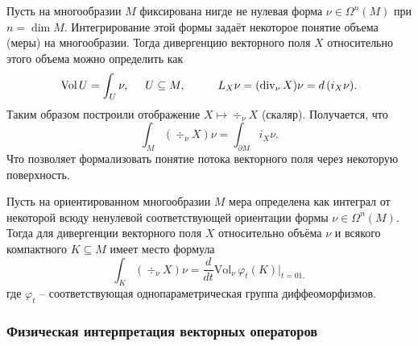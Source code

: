 \begin{to_tas}
     Пусть на многообразии $M$ фиксирована нигде не нулевая форма $\nu \in \Omega^n(M)$ при $n = \dim M$. Интегрирование этой формы задаёт некоторое понятие объема (меры) на многообразии. Тогда дивергенцию векторного поля $X$ относительно этого объема можно определить как
     \begin{equation*}
        \text{Vol}\, U = \int_U \nu, 
        \hspace{0.5cm} 
        U \subseteq M,
        \hspace{1cm}
         L_X \nu = (\div_\nu X) \nu = d\, (i_X \nu).
     \end{equation*}
     Таким образом построили отображение $X \mapsto \div_\nu X$ (скаляр). Получается, что
    \begin{equation*}
        \int_M (\div_\nu X) \nu = \int_{\partial M} i_X \nu.
    \end{equation*}
    Что позволяет формализовать понятие потока векторного поля через некоторую поверхность.
\end{to_tas}

\begin{to_thr}
     Пусть на ориентированном многообразии $M$ мера определена как интеграл от некоторой всюду ненулевой соответствующей ориентации формы $\nu \in \Omega^n (M)$. Тогда для дивергенции векторного поля $X$ относительно объёма $\nu$ и всякого компактного $K \subseteq M$ имеет место формула
     \begin{equation*}
         \int_K (\div_\nu X) \nu = \frac{d}{dt} \text{Vol}_\nu\, \varphi_t (K) \bigg|_{t=01,}
     \end{equation*}
     где $\varphi_t$ -- соответствующая однопараметрическая группа диффеоморфизмов.
\end{to_thr}

\subsubsection*{Физическая интерпретация векторных операторов}

